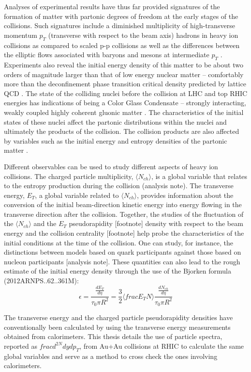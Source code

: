 Analyses of experimental results have thus far provided signatures of the formation of matter with partonic degrees of freedom at the early stages of the collisions. Such signatures include a diminished multiplicity of high-transverse momentum $p_{T}$ (transverse with respect to the beam axis) hadrons in heavy ion collisions as compared to scaled p-p collisions as well as the differences between the elliptic flows associated with baryons and mesons at intermediate $p_{T}$ \cite{PhysRevC.96.044904}. Experiments also reveal the initial energy density of this matter to be about two orders of magnitude larger than that of low energy nuclear matter -- comfortably more than the deconfinement phase transition critical density predicted by lattice QCD \cite{2005PrPNP..54..443J}.
The state of the colliding nuclei before the collision at LHC and top RHIC energies has indications of being a Color Glass Condensate -- strongly interacting, weakly coupled highly coherent gluonic matter \cite{1742-6596-458-1-012024}. The characteristics of the initial states of these nuclei affect the partonic distributions within the nuclei and ultimately the products of the collision. The collision products are also affected by variables such as the initial energy and entropy densities of the partonic matter \cite{2005PrPNP..54..443J}.

Different observables can be used to study different aspects of heavy ion collisions. The charged particle multiplicity, $\langle N_{ch} \rangle$, is a global variable that relates to the entropy production during the collision (analysis note). The transverse energy, $E_{T}$, a global variable related to $\langle N_{ch} \rangle$, provides information about the conversion of the initial beam-direction kinetic energy into energy flowing in the transverse direction after the collision. Together, the studies of the fluctuation of the $\langle N_{ch} \rangle$ and the $E_{T}$ pseudorapidity [footnote] density with respect to the beam energy and the collision centrality [footnote] help probe the characteristics of the initial conditions at the time of the collision. One can study, for instance, the distinctions between models based on quark participants against those based on nucleon participants [analysis note]. These quantities can also lead to the rough estimate of the initial energy density through the use of the Bjorken formula (2012ARNPS..62..361M):
\begin{equation}\label{eqn:Bjorken}
\epsilon = \frac{\frac{dE_{T}}{d\eta}}{\tau_{0}\pi R^{2}} = \frac{3}{2}\langle frac{E_{T}}{N} \rangle \frac{\frac{dN_{ch}}{d\eta}}{\tau_{0}\pi R^{2}}
\end{equation}

The transverse energy and the charged particle pseudorapidity densities have conventionally been calculated by using the transverse energy measurements obtained from calorimeters. This thesis details the use of particle spectra, reported as $frac{d^{2N}}{dydp_{T}}$, from Au+Au collisions at RHIC to calculate the same global variables and serve as a method to cross check the ones involving calorimeters. 

